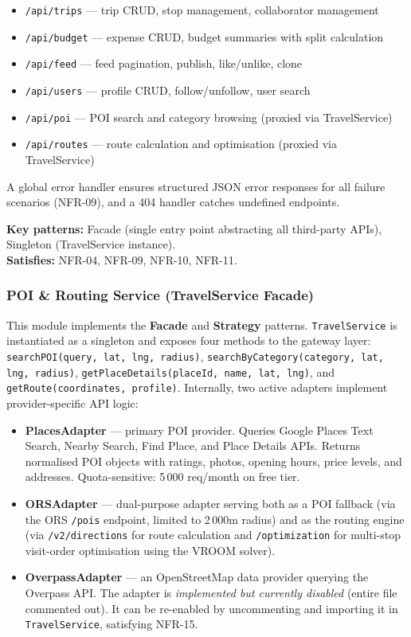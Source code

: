 \documentclass[12pt, a4paper]{article}
\begin{document}
\begin{itemize}
  \item \texttt{/api/trips} --- trip CRUD, stop management, collaborator management
  \item \texttt{/api/budget} --- expense CRUD, budget summaries with split calculation
  \item \texttt{/api/feed} --- feed pagination, publish, like/unlike, clone
  \item \texttt{/api/users} --- profile CRUD, follow/unfollow, user search
  \item \texttt{/api/poi} --- POI search and category browsing (proxied via TravelService)
  \item \texttt{/api/routes} --- route calculation and optimisation (proxied via TravelService)
\end{itemize}

A global error handler ensures structured JSON error responses for all failure scenarios (NFR-09), and a 404 handler catches undefined endpoints.

\begin{tcolorbox}[notebox]
  \textbf{Key patterns:} Facade (single entry point abstracting all third-party APIs), Singleton (TravelService instance).\\[2pt]
  \textbf{Satisfies:} NFR-04, NFR-09, NFR-10, NFR-11.
\end{tcolorbox}

\subsubsection{POI \& Routing Service (TravelService Facade)}

This module implements the \textbf{Facade} and \textbf{Strategy} patterns. \texttt{TravelService} is instantiated as a singleton and exposes four methods to the gateway layer: \texttt{searchPOI(query, lat, lng, radius)}, \texttt{searchByCategory(category, lat, lng, radius)}, \texttt{getPlaceDetails(placeId, name, lat, lng)}, and \texttt{getRoute(coordinates, profile)}. Internally, two active adapters implement provider-specific API logic:

\begin{itemize}
  \item \textbf{PlacesAdapter} --- primary POI provider. Queries Google Places Text Search, Nearby Search, Find Place, and Place Details APIs. Returns normalised POI objects with ratings, photos, opening hours, price levels, and addresses. Quota-sensitive: 5\,000 req/month on free tier.
  \item \textbf{ORSAdapter} --- dual-purpose adapter serving both as a POI fallback (via the ORS \texttt{/pois} endpoint, limited to 2\,000m radius) and as the routing engine (via \texttt{/v2/directions} for route calculation and \texttt{/optimization} for multi-stop visit-order optimisation using the VROOM solver).
  \item \textbf{OverpassAdapter} --- an OpenStreetMap data provider querying the Overpass API. The adapter is \emph{implemented but currently disabled} (entire file commented out). It can be re-enabled by uncommenting and importing it in \texttt{TravelService}, satisfying NFR-15.
\end{itemize}
\end{document}
